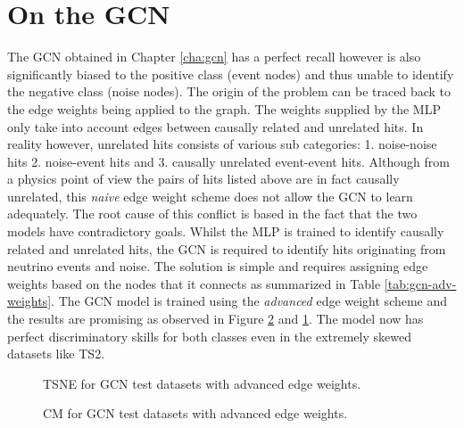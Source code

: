 \section{On the GCN}
The GCN obtained in Chapter \ref{cha:gcn} has a perfect recall however
is also significantly biased to the positive class (event nodes) and
thus unable to identify the negative class (noise nodes). The origin
of the problem can be traced back to the edge weights being applied to
the graph. The weights supplied by the MLP only take into account
edges between causally related and unrelated hits. In reality however,
unrelated hits consists of various sub categories: 1. noise-noise hits
2. noise-event hits and 3. causally unrelated event-event hits.
Although from a physics point of view the pairs of hits listed above
are in fact causally unrelated, this \emph{naive} edge weight scheme
does not allow the GCN to learn adequately. The root cause of this
conflict is based in the fact that the two models have contradictory
goals. Whilst the MLP is trained to identify causally related and
unrelated hits, the GCN is required to identify hits originating from
neutrino events and noise. The solution is simple and requires
assigning edge weights based on the nodes that it connects as
summarized in Table \ref{tab:gcn-adv-weights}. The GCN model is
trained using the \emph{advanced} edge weight scheme and the results
are promising as observed in Figure \ref{fig:gcn-cm-adv} and
\ref{fig:gcn-test-tsne-adv}. The model now has perfect discriminatory
skills for both classes even in the extremely skewed datasets like
TS2.

\begin{figure}[htb]
  \centering
  \caption{TSNE for GCN test datasets with advanced edge weights.}
  \label{fig:gcn-test-tsne-adv}
\end{figure}

\begin{figure}[htb]
  \centering
  \caption{CM for GCN test datasets with advanced edge weights.}
  \label{fig:gcn-cm-adv}
\end{figure}

